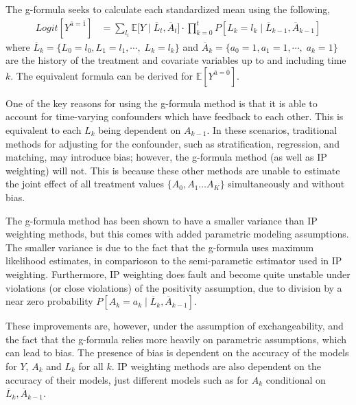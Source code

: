 The g-formula seeks to calculate each standardized mean using the following, 
\begin{align} \label{eq:3} 
Logit[Y^{\bar{a}= \bar{1}}] &= \sum_{l_i} \mathbb{E} \big[Y \mid  \overline{L}_{t}, \overline{A}_{t} \big]\cdot \prod_{k=0}^t P[L_k = l_k \mid \overline{L}_{k-1}, \overline{A}_{k-1}]
\end{align}
where $\overline{L}_k = \{L_{0} = l_0, L_{1} = l_1,  \cdots, \; L_{k} = l_k\}$ and $\overline{A}_k = \{a_{0} = 1, a_{1} = 1,  \cdots, \; a_{k} = 1\}$ are the history of the treatment and covariate variables up to and including time $k$.  The equivalent formula can be derived for $ \mathbb{E}[Y^{\bar{a} = \bar{0}}]$.   


One of the key reasons for using the g-formula method is that it is able to account for time-varying confounders which have feedback to each other.  This is equivalent to each $L_k$ being dependent on $A_{k-1}$.\cite{robins1986new}  In these scenarios, traditional methods for adjusting for the confounder, such as stratification, regression, and matching, may introduce bias; however, the g-formula method (as well as IP weighting) will not.\cite{wright2015international}  This is because these other methods are unable to estimate the joint effect of all treatment values $\{A_0, A_1 \dots A_K \}$ simultaneously and without bias.\cite{fitzmaurice2008longitudinal}  

The g-formula method has been shown to have a smaller variance than IP weighting methods, but this comes with added parametric modeling assumptions.\cite{young2011comparative} The smaller variance is due to the fact that the g-formula uses maximum likelihood estimates, in comparioson to the semi-parametic estimator used in IP weighting. Furthermore, IP weighting does fault and become quite unstable under violations (or close violations) of the positivity assumption, due to division by a near zero probability $P[A_k=a_k \mid \overline{L}_k, \overline{A}_{k-1}]$.  

These improvements are, however, under the assumption of exchangeability, and the fact that the g-formula relies more heavily on parametric assumptions, which can lead to bias.  The presence of bias is dependent on the accuracy of the models for $Y$, $A_k$ and $L_k$ for all $k$.  IP weighting methods are also dependent on the accuracy of their models, just different models such as for $A_k$ conditional on $\overline{L}_k, \overline{A}_{k-1}$.  

